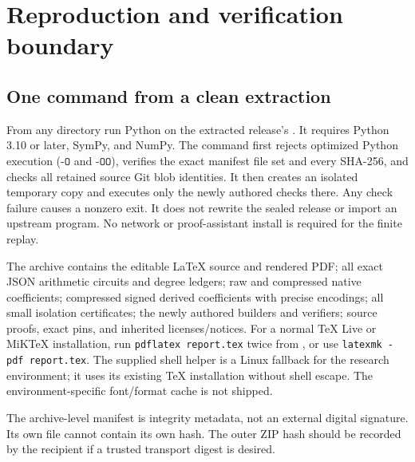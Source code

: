 \section{Reproduction and verification boundary}
\subsection{One command from a clean extraction}
From any directory run Python on the extracted release's
. It requires Python 3.10 or later, SymPy, and NumPy.
The command first rejects optimized Python execution ($\texttt{-O}$ and
$\texttt{-OO}$), verifies the exact manifest file set and every SHA-256,
and checks all retained source Git blob identities. It then creates an
isolated temporary copy and executes only the newly authored checks there.
Any check failure causes a nonzero exit. It does not rewrite the sealed
release or import an upstream program. No network or proof-assistant install
is required for the finite replay.

The archive contains the editable \LaTeX{} source and rendered PDF;
all exact JSON arithmetic circuits and degree ledgers; raw and compressed
native coefficients; compressed signed derived coefficients with precise
encodings; all small isolation certificates; the newly authored builders and
verifiers; source proofs, exact pins, and inherited licenses/notices.
For a normal TeX Live or MiKTeX installation, run \texttt{pdflatex report.tex}
twice from , or use \texttt{latexmk -pdf report.tex}.
The supplied shell helper is a Linux fallback for the research environment;
it uses its existing TeX installation without shell escape.
The environment-specific font/format cache is not shipped.

The archive-level manifest is integrity metadata, not an external digital
signature. Its own file cannot contain its own hash. The outer ZIP hash
should be recorded by the recipient if a trusted transport digest is desired.

